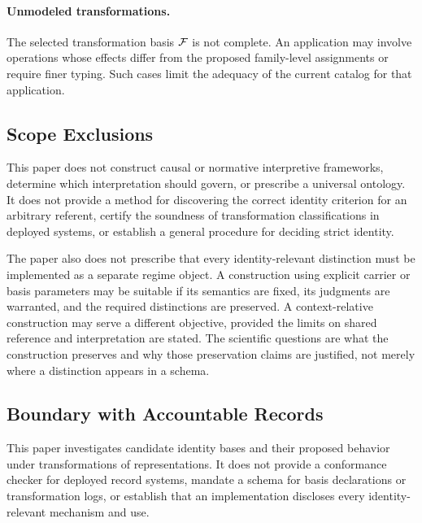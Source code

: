 \paragraph{Unmodeled transformations.}
The selected transformation basis $\mathcal{F}$ is not complete.
An application may involve operations whose effects differ from the
proposed family-level assignments or require finer typing.
Such cases limit the adequacy of the current catalog for that
application.

\subsection{Scope Exclusions}
\label{subsec:limits_scope_exclusions}

This paper does not construct causal or normative interpretive
frameworks, determine which interpretation should govern, or prescribe
a universal ontology.
It does not provide a method for discovering the
correct identity criterion for an arbitrary referent, certify the
soundness of transformation classifications in deployed systems, or
establish a general procedure for deciding strict identity.

The paper also does not prescribe that every identity-relevant
distinction must be implemented as a separate regime object.
A construction using explicit carrier or basis parameters may be
suitable if its semantics are fixed, its judgments are warranted,
and the required distinctions are preserved.
A context-relative construction may serve a different objective,
provided the limits on shared reference and interpretation are stated.
The scientific questions are what the construction preserves and why
those preservation claims are justified, not merely where a distinction
appears in a schema.

\subsection{Boundary with Accountable Records}
\label{subsec:limits_boundary_accountable_records}

This paper investigates candidate identity bases and their proposed
behavior under transformations of representations.
It does not provide a conformance checker for deployed record systems,
mandate a schema for basis declarations or transformation logs, or
establish that an implementation discloses every identity-relevant
mechanism and use.

